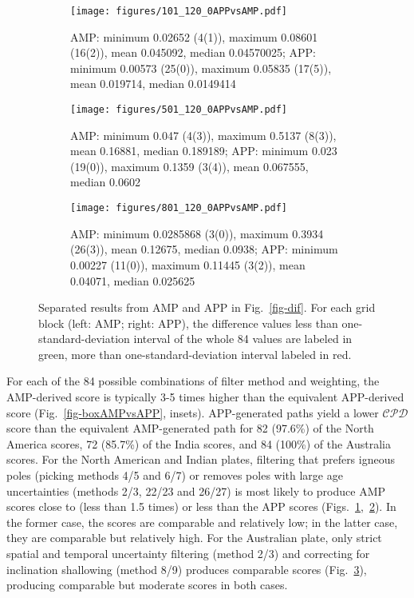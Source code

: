 \begin{figure*}
	\centering
	\begin{subfigure}{1.01\textwidth}
		\texttt{[image: figures/101\_120\_0APPvsAMP.pdf]}
		\caption{AMP: minimum 0.02652 (4(1)), maximum 0.08601 (16(2)), mean
		0.045092, median 0.04570025; APP: minimum 0.00573 (25(0)), maximum
		0.05835 (17(5)), mean 0.019714, median 0.0149414}\label{fig-na-difAMPvsAPP}
	\end{subfigure}
	\vspace{.1em}
	\begin{subfigure}{1.01\textwidth}
		\texttt{[image: figures/501\_120\_0APPvsAMP.pdf]}
		\caption{AMP: minimum 0.047 (4(3)), maximum 0.5137 (8(3)), mean
		0.16881, median 0.189189; APP: minimum 0.023 (19(0)), maximum 0.1359
		(3(4)), mean 0.067555, median 0.0602}\label{fig-in-difAMPvsAPP}
	\end{subfigure}
	\vspace{.1em}
	\begin{subfigure}{1.01\textwidth}
		\texttt{[image: figures/801\_120\_0APPvsAMP.pdf]}
		\caption{AMP: minimum 0.0285868 (3(0)), maximum 0.3934 (26(3)), mean
		0.12675, median 0.0938; APP: minimum 0.00227 (11(0)), maximum 0.11445
		(3(2)), mean 0.04071, median 0.025625}\label{fig-au-difAMPvsAPP}
	\end{subfigure}
	\caption[Differences of each plate's paleomagnetic APWPs versus its FHM
predicted APWP (AMP vs APP)]{Separated results from AMP and APP in
Fig.~\ref{fig-dif}. For each grid block (left: AMP; right: APP), the difference
values less than one-standard-deviation interval of the whole 84 values are
labeled in green, more than one-standard-deviation interval labeled in
red.}\label{fig-difAMPvsAPP}
\end{figure*}

For each of the 84 possible combinations of filter method and weighting, the
AMP-derived score is typically 3-5 times higher than the equivalent APP-derived
score (Fig.~\ref{fig-boxAMPvsAPP}, insets). APP-generated paths yield a lower
$\mathcal{CPD}$ score than the equivalent AMP-generated path for 82 (97.6\%) of
the North America scores, 72 (85.7\%) of the India scores, and 84 (100\%) of the
Australia scores. For the North American and Indian plates, filtering that
prefers igneous poles (picking methods 4/5 and 6/7) or removes poles with large
age uncertainties (methods 2/3, 22/23 and 26/27) is most likely to produce AMP
scores close to (less than 1.5 times) or less than the APP scores
(Figs.~\ref{fig-na-difAMPvsAPP},~\ref{fig-in-difAMPvsAPP}). In the former case,
the scores are comparable and relatively low; in the latter case, they are
comparable but relatively high. For the Australian plate, only strict spatial
and temporal uncertainty filtering (method 2/3) and correcting for inclination
shallowing (method 8/9) produces comparable scores
(Fig.~\ref{fig-au-difAMPvsAPP}), producing comparable but moderate scores in
both cases.

